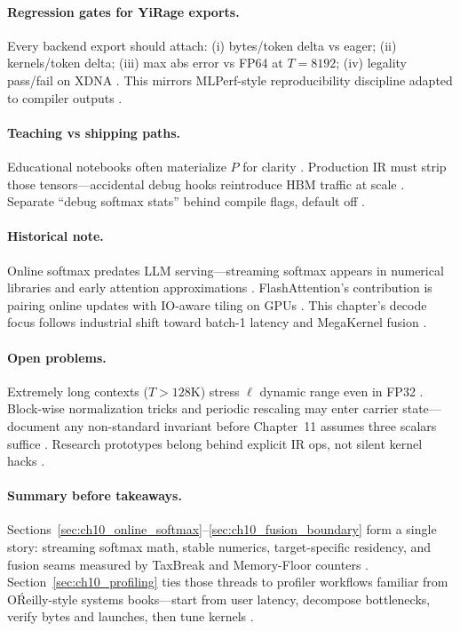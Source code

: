 \paragraph{Regression gates for YiRage exports.} Every backend export should attach: (i) bytes/token delta vs eager; (ii) kernels/token delta; (iii) max abs error vs FP64 at $T=8192$; (iv) legality pass/fail on XDNA \citep{yirage2026,amd2024aie,memoryfloor2026}. This mirrors MLPerf-style reproducibility discipline adapted to compiler outputs \citep{patel2025llminference,taxbreak2026}.

\paragraph{Teaching vs shipping paths.} Educational notebooks often materialize $P$ for clarity \citep{dlbook}. Production IR must strip those tensors---accidental debug hooks reintroduce HBM traffic at scale \citep{memoryfloor2026,nvidia2024cudagraphs}. Separate ``debug softmax stats'' behind compile flags, default off \citep{chen2020compilerbasedhardw,yirage2026}.

\paragraph{Historical note.} Online softmax predates LLM serving---streaming softmax appears in numerical libraries and early attention approximations \citep{dlbook,dao2022flashattention}. FlashAttention's contribution is pairing online updates with IO-aware tiling on GPUs \citep{dao2022flashattention,dao2023flashdecoding}. This chapter's decode focus follows industrial shift toward batch-1 latency and MegaKernel fusion \citep{taxbreak2026,kwon2023vllm,patel2025llminference}.

\paragraph{Open problems.} Extremely long contexts ($T>128$K) stress $\ell$ dynamic range even in FP32 \citep{patel2025llminference,liu2024deepseekv3}. Block-wise normalization tricks and periodic rescaling may enter carrier state---document any non-standard invariant before Chapter~11 assumes three scalars suffice \citep{yirage2026,dao2023flashdecoding}. Research prototypes belong behind explicit IR ops, not silent kernel hacks \citep{chen2020compilerbasedhardw}.


\paragraph{Summary before takeaways.} Sections~\ref{sec:ch10_online_softmax}--\ref{sec:ch10_fusion_boundary} form a single story: streaming softmax math, stable numerics, target-specific residency, and fusion seams measured by TaxBreak and Memory-Floor counters \citep{taxbreak2026,memoryfloor2026,dao2022flashattention,amd2024xdna,yirage2026}. Section~\ref{sec:ch10_profiling} ties those threads to profiler workflows familiar from O\'Reilly-style systems books---start from user latency, decompose bottlenecks, verify bytes and launches, then tune kernels \citep{patel2025llminference,semianalysis2024tma,chen2020compilerbasedhardw,dlbook,kwon2023vllm,liu2024deepseekv3,nvidia2024cudagraphs}.
